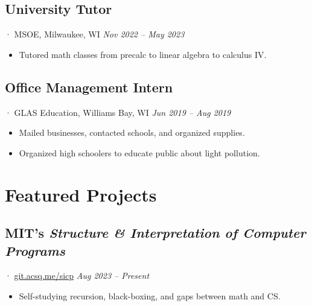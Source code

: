 \documentclass[12pt]{article}
\newcommand{\itemspace}{\vspace{0.3170em}}
\begin{document}
\itemspace

\subsection{University Tutor}
· MSOE, Milwaukee, WI \hfill \textit{Nov 2022 -- May 2023}

\begin{itemize}[noitemsep,nolistsep]
  \item Tutored math classes from precalc to linear algebra to calculus IV.
\end{itemize}

\itemspace

\subsection{Office Management Intern}
· GLAS Education, Williams Bay, WI  \hfill \textit{Jun 2019 -- Aug 2019}

\begin{itemize}[noitemsep,nolistsep]
  \item Mailed businesses, contacted schools, and organized supplies.

  \item Organized high schoolers to educate public about light pollution.
\end{itemize}

\itemspace

\section{Featured Projects}

\subsection{MIT's \textit{Structure \& Interpretation of Computer Programs}} ·
\href{https://git.acsq.me/sicp/about/}{git.acsq.me/sicp}
\hfill \textit{Aug 2023 -- Present}

\begin{itemize}[noitemsep,nolistsep]
  \item Self-studying recursion, black-boxing, and gaps between math and CS.
\end{itemize}
\end{document}
